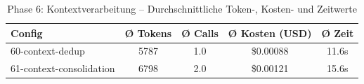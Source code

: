 \begin{table}[H]
\centering
\small
\begin{tabular}{lcccc}
\toprule
Config & Ø Tokens & Ø Calls & Ø Kosten (USD) & Ø Zeit \\
\midrule
60-context-dedup & 5787 & 1.0 & \$0.00088 & 11.6s \\
61-context-consolidation & 6798 & 2.0 & \$0.00121 & 15.6s \\
\bottomrule
\end{tabular}
\caption{Phase 6: Kontextverarbeitung -- Durchschnittliche Token-, Kosten- und Zeitwerte}
\label{tab:phase6_cost}
\end{table}